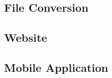 

\subsection{File Conversion}
\begin{DoxyCompactList}
    
\end{DoxyCompactList}


\subsection{Website}
\begin{DoxyCompactList}
    
\end{DoxyCompactList}


\subsection{Mobile Application}
\begin{DoxyCompactList}
    
\end{DoxyCompactList}